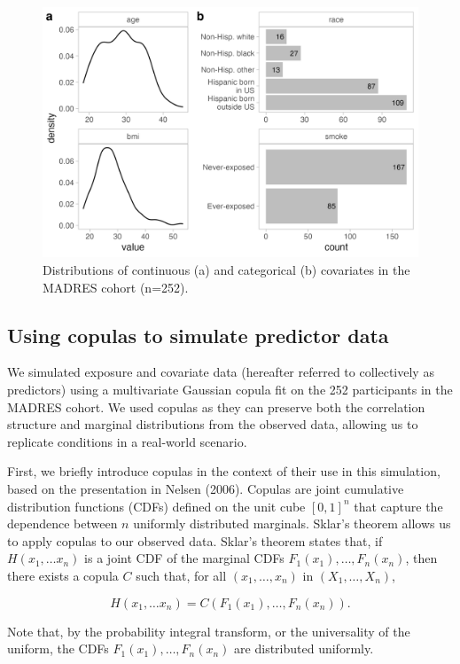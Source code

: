 \documentclass[12pt, twoside]{amherstthesis}
\begin{document}
\begin{figure}

{\centering \includegraphics[width=0.75\linewidth]{figures/ch4_covdist} 

}

\caption{Distributions of continuous (a) and categorical (b) covariates in the MADRES cohort (n=252).}\label{fig:covdist}
\end{figure}
\hypertarget{copula}{%
\subsection{Using copulas to simulate predictor data}\label{copula}}

We simulated exposure and covariate data (hereafter referred to collectively as predictors) using a multivariate Gaussian copula fit on the 252 participants in the MADRES cohort. We used copulas as they can preserve both the correlation structure and marginal distributions from the observed data, allowing us to replicate conditions in a real-world scenario.

First, we briefly introduce copulas in the context of their use in this simulation, based on the presentation in Nelsen (2006). Copulas are joint cumulative distribution functions (CDFs) defined on the unit cube \([0,1]^n\) that capture the dependence between \(n\) uniformly distributed marginals. Sklar's theorem allows us to apply copulas to our observed data. Sklar's theorem states that, if \(H(x_1, \dots x_n)\) is a joint CDF of the marginal CDFs \(F_1(x_1), \dots, F_n(x_n)\), then there exists a copula \(C\) such that, for all \((x_1, \dots, x_n)\) in \((X_1, \dots, X_n)\),

\[
H(x_1, \dots x_n)=C(F_1(x_1), \dots, F_n(x_n)).
\]

\noindent Note that, by the probability integral transform, or the universality of the uniform, the CDFs \(F_1(x_1), \dots, F_n(x_n)\) are distributed uniformly.
\end{document}
